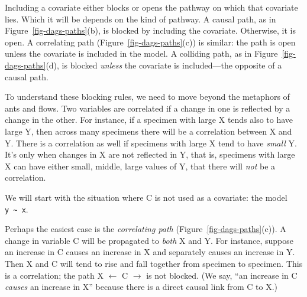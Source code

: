 \documentclass[
  letterpaper,
  DIV=11,
  numbers=noendperiod,
  oneside]{scrartcl}
\begin{document}
Including a covariate either blocks or opens the pathway on which that
covariate lies. Which it will be depends on the kind of pathway. A
causal path, as in Figure~\ref{fig-dags-paths}(b), is blocked by
including the covariate. Otherwise, it is open. A correlating path
(Figure~\ref{fig-dags-paths}(c)) is similar: the path is open unless the
covariate is included in the model. A colliding path, as in
Figure~\ref{fig-dags-paths}(d), is blocked \emph{unless} the covariate
is included---the opposite of a causal path.

\begin{tcolorbox}[enhanced jigsaw, colbacktitle=quarto-callout-note-color!10!white, opacityback=0, breakable, opacitybacktitle=0.6, colback=white, coltitle=black, arc=.35mm, title=\textcolor{quarto-callout-note-color}{\faInfo}\hspace{0.5em}{Where do the blocking rules come from?}, left=2mm, colframe=quarto-callout-note-color-frame, rightrule=.15mm, bottomrule=.15mm, leftrule=.75mm, bottomtitle=1mm, toptitle=1mm, titlerule=0mm, toprule=.15mm]

To understand these blocking rules, we need to move beyond the metaphors
of ants and flows. Two variables are correlated if a change in one is
reflected by a change in the other. For instance, if a specimen with
large X tends also to have large Y, then across many specimens there
will be a correlation between X and Y.
{} There is a correlation as well if specimens with
large X tend to have \emph{small} Y. It's only when changes in X are not
reflected in Y, that is, specimens with large X can have either small,
middle, large values of Y, that there will \emph{not} be a correlation.

We will start with the situation where C is not used as a covariate: the
model \texttt{y\ \textasciitilde{}\ x}.

Perhaps the easiest case is the \emph{correlating path}
(Figure~\ref{fig-dags-paths}(c)). A change in variable C will be
propagated to \emph{both} X and Y. For instance, suppose an increase in
C causes an increase in X and separately causes an increase in Y. Then X
and C will tend to rise and fall together from specimen to specimen.
This is a correlation; the path X \(\leftarrow\) C \(\rightarrow\) is
not blocked. (We say, ``an increase in C \emph{causes} an increase in
X'' because there is a direct causal link from C to X.)


\end{tcolorbox}
\end{document}
